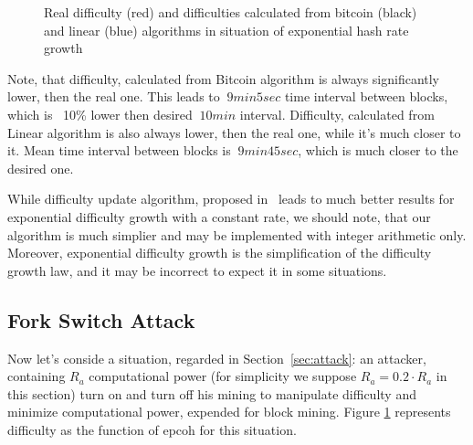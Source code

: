 \documentclass[number,preprint,review]{elsarticle}
\begin{document}
\begin{figure}[h]
\caption{Real difficulty (red) and difficulties calculated from bitcoin (black) and linear (blue) algorithms in situation of exponential hash rate growth}
\label{fig:exp}
\end{figure}

Note, that difficulty, calculated from Bitcoin algorithm is always significantly lower, then the real one.
This leads to \(~ 9 min 5 sec\) time interval between blocks, which is ~10\% lower then desired \(~ 10 min\) interval.
Difficulty, calculated from Linear algorithm is also always lower, then the real one, while it's much closer to it.
Mean time interval between blocks is \(~ 9 min 45 sec\), which is much closer to the desired one.

While difficulty update algorithm, proposed in~\cite{kraft2015difficulty} leads to much better results for exponential difficulty growth with a constant rate, we should note, that our algorithm is much simplier and may be implemented with integer arithmetic only.
Moreover, exponential difficulty growth is the simplification of the difficulty growth law, and it may be incorrect to expect it in some situations.

\subsection{Fork Switch Attack}

Now let's conside a situation, regarded in Section~\ref{sec:attack}: an attacker, containing \(R_a\) computational power (for simplicity we suppose \(R_a=0.2 \cdot R_a \) in this section) turn on and turn off his mining to manipulate difficulty and minimize computational power, expended for block mining.
Figure \ref{fig:exp} represents difficulty as the function of epcoh for this situation.
\end{document}
